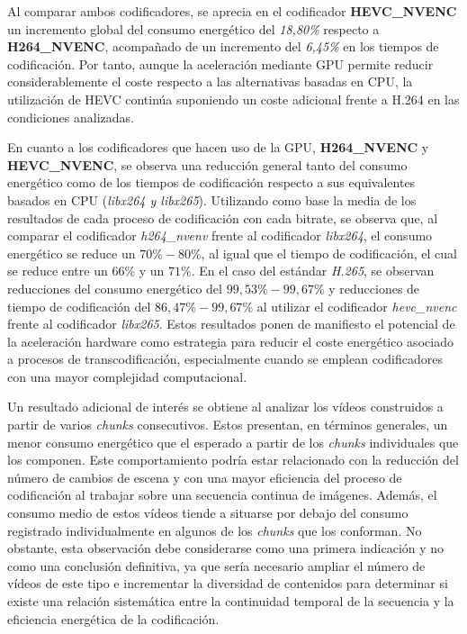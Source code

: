  Al comparar ambos codificadores, se aprecia en el codificador \textbf{HEVC\_NVENC} un incremento global del consumo energético del \textit{18,80\%} respecto a \textbf{H264\_NVENC}, acompañado de un incremento del \textit{6,45\%} en los tiempos de codificación. Por tanto, aunque la aceleración mediante GPU permite reducir considerablemente el coste respecto a las alternativas basadas en CPU, la utilización de HEVC continúa suponiendo un coste adicional frente a H.264 en las condiciones analizadas.
 
 En cuanto a los codificadores que hacen uso de la GPU, \textbf{H264\_NVENC} y \textbf{HEVC\_NVENC}, se observa una reducción general tanto del consumo energético como de los tiempos de codificación respecto a sus equivalentes basados en CPU (\textit{libx264 y libx265}). Utilizando como base la media de los resultados de cada proceso de codificación con cada bitrate, se observa que, al comparar el codificador \textit{h264\_nvenv} frente al codificador \textit{libx264}, el consumo energético se reduce un $70\%-80\%$, al igual que el tiempo de codificación, el cual se reduce entre un $66\%$ y un $71\%$. En el caso del estándar \textit{H.265}, se observan reducciones del consumo energético del $99,53\%-99,67\%$ y reducciones de tiempo de codificación del $86,47\%-99,67\%$ al utilizar el codificador \textit{hevc\_nvenc} frente al codificador \textit{libx265}. Estos resultados ponen de manifiesto el potencial de la aceleración hardware como estrategia para reducir el coste energético asociado a procesos de transcodificación, especialmente cuando se emplean codificadores con una mayor complejidad computacional.

 Un resultado adicional de interés se obtiene al analizar los vídeos construidos a partir de varios \textit{chunks} consecutivos. Estos presentan, en términos generales, un menor consumo energético que el esperado a partir de los \textit{chunks} individuales que los componen. Este comportamiento podría estar relacionado con la reducción del número de cambios de escena y con una mayor eficiencia del proceso de codificación al trabajar sobre una secuencia continua de imágenes. Además, el consumo medio de estos vídeos tiende a situarse por debajo del consumo registrado individualmente en algunos de los \textit{chunks} que los conforman. No obstante, esta observación debe considerarse como una primera indicación y no como una conclusión definitiva, ya que sería necesario ampliar el número de vídeos de este tipo e incrementar la diversidad de contenidos para determinar si existe una relación sistemática entre la continuidad temporal de la secuencia y la eficiencia energética de la codificación.


